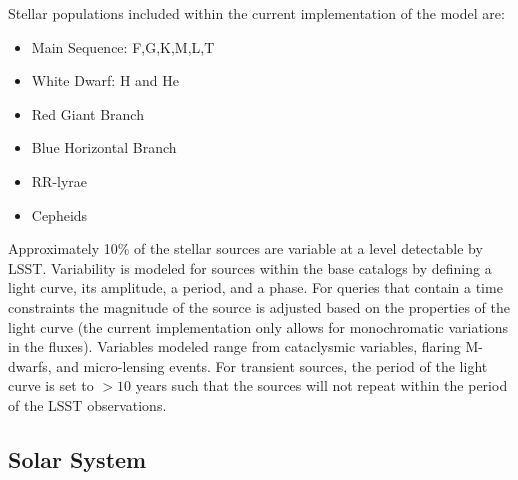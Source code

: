 \documentclass[]{article}
\begin{document}
{Stellar  populations included within the current implementation of the model are:
\begin{itemize}
\item Main Sequence: F,G,K,M,L,T
\item White Dwarf: H and He
\item Red Giant Branch
\item Blue Horizontal Branch
\item RR-lyrae
\item Cepheids
\end{itemize}

Approximately 10\% of the stellar sources are variable at a level detectable
by LSST.
Variability is modeled for sources within the base catalogs
by defining a light curve, its amplitude, a period, and a phase. For
queries that contain a time constraints the magnitude of the source is
adjusted based on the properties of the light curve (the current
implementation only allows for monochromatic variations in the
fluxes). Variables modeled range from cataclysmic variables, flaring
M-dwarfs, and micro-lensing events. For transient sources, the period
of the light curve is set to $>10$ years such that the sources will
not repeat within the period of the LSST observations.


\subsection{Solar System \label{sec:ssm}}

}
\end{document}
